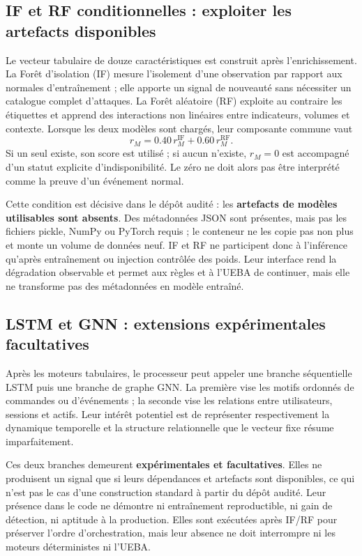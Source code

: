 \documentclass[11pt,a4paper,oneside]{report}
\theoremstyle{definition}
\theoremstyle{plain}
\begin{document}
\subsection{IF et RF conditionnelles : exploiter les artefacts disponibles}

Le vecteur tabulaire de douze caractéristiques est construit après
l'enrichissement. La Forêt d'isolation (IF) mesure l'isolement d'une
observation par rapport aux normales d'entraînement ; elle apporte un signal
de nouveauté sans nécessiter un catalogue complet d'attaques. La Forêt
aléatoire (RF) exploite au contraire les étiquettes et apprend des interactions
non linéaires entre indicateurs, volumes et contexte. Lorsque les deux modèles
sont chargés, leur composante commune vaut
\[
 r_M=0.40\,r_M^{\mathrm{IF}}+0.60\,r_M^{\mathrm{RF}}.
\]
Si un seul existe, son score est utilisé ; si aucun n'existe, \(r_M=0\) est
accompagné d'un statut explicite d'indisponibilité. Le zéro ne doit alors pas
être interprété comme la preuve d'un événement normal.

Cette condition est décisive dans le dépôt audité : les \textbf{artefacts de
modèles utilisables sont absents}. Des métadonnées JSON sont présentes, mais
pas les fichiers pickle, NumPy ou PyTorch requis ; le conteneur ne les copie
pas non plus et monte un volume de données neuf. IF et RF ne participent donc
à l'inférence qu'après entraînement ou injection contrôlée des poids. Leur
interface rend la dégradation observable et permet aux règles et à l'UEBA de
continuer, mais elle ne transforme pas des métadonnées en modèle entraîné.

\subsection{LSTM et GNN : extensions expérimentales facultatives}

Après les moteurs tabulaires, le processeur peut appeler une branche
séquentielle LSTM puis une branche de graphe GNN. La première vise les motifs
ordonnés de commandes ou d'événements ; la seconde vise les relations entre
utilisateurs, sessions et actifs. Leur intérêt potentiel est de représenter
respectivement la dynamique temporelle et la structure relationnelle que le
vecteur fixe résume imparfaitement.

Ces deux branches demeurent \textbf{expérimentales et facultatives}. Elles ne
produisent un signal que si leurs dépendances et artefacts sont disponibles,
ce qui n'est pas le cas d'une construction standard à partir du dépôt audité.
Leur présence dans le code ne démontre ni entraînement reproductible, ni gain
de détection, ni aptitude à la production. Elles sont exécutées après IF/RF
pour préserver l'ordre d'orchestration, mais leur absence ne doit interrompre
ni les moteurs déterministes ni l'UEBA.
\end{document}
